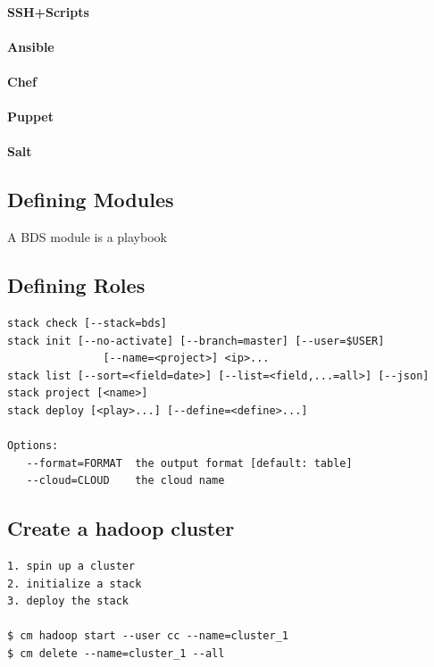\paragraph{SSH+Scripts}
\paragraph{Ansible}
\paragraph{Chef}
\paragraph{Puppet}
\paragraph{Salt}

\subsection{Defining Modules}
A BDS module is a playbook 

\subsection{Defining Roles}

\begin{Verbatim}[fontfamily=helvetica]
stack check [--stack=bds]
stack init [--no-activate] [--branch=master] [--user=$USER] 
               [--name=<project>] <ip>...
stack list [--sort=<field=date>] [--list=<field,...=all>] [--json]
stack project [<name>]
stack deploy [<play>...] [--define=<define>...]

Options:
   --format=FORMAT  the output format [default: table]
   --cloud=CLOUD    the cloud name
\end{Verbatim}

\subsection{Create a hadoop cluster}

\begin{Verbatim}[fontfamily=helvetica]
1. spin up a cluster
2. initialize a stack
3. deploy the stack

$ cm hadoop start --user cc --name=cluster_1
$ cm delete --name=cluster_1 --all  
\end{Verbatim}



